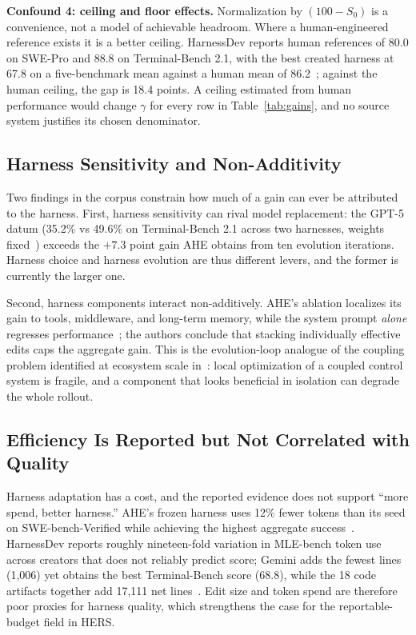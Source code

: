 \documentclass[conference]{IEEEtran}
\begin{document}
\textbf{Confound 4: ceiling and floor effects.} Normalization by $(100-S_0)$ is a convenience, not a model of achievable headroom. Where a human-engineered reference exists it is a better ceiling. HarnessDev reports human references of 80.0 on SWE-Pro and 88.8 on Terminal-Bench 2.1, with the best created harness at 67.8 on a five-benchmark mean against a human mean of 86.2~\cite{b6}; against the human ceiling, the gap is 18.4 points. A ceiling estimated from human performance would change $\gamma$ for every row in Table~\ref{tab:gains}, and no source system justifies its chosen denominator.

\subsection{Harness Sensitivity and Non-Additivity}

Two findings in the corpus constrain how much of a gain can ever be attributed to the harness. First, harness sensitivity can rival model replacement: the GPT-5 datum (35.2\% vs 49.6\% on Terminal-Bench 2.1 across two harnesses, weights fixed~\cite{b6}) exceeds the $+7.3$ point gain AHE obtains from ten evolution iterations. Harness choice and harness evolution are thus different levers, and the former is currently the larger one.

Second, harness components interact non-additively. AHE's ablation localizes its gain to tools, middleware, and long-term memory, while the system prompt \emph{alone} regresses performance~\cite{b3}; the authors conclude that stacking individually effective edits caps the aggregate gain. This is the evolution-loop analogue of the coupling problem identified at ecosystem scale in~\cite{b2}: local optimization of a coupled control system is fragile, and a component that looks beneficial in isolation can degrade the whole rollout.

\subsection{Efficiency Is Reported but Not Correlated with Quality}

Harness adaptation has a cost, and the reported evidence does not support ``more spend, better harness.'' AHE's frozen harness uses 12\% fewer tokens than its seed on SWE-bench-Verified while achieving the highest aggregate success~\cite{b3}. HarnessDev reports roughly nineteen-fold variation in MLE-bench token use across creators that does not reliably predict score; Gemini adds the fewest lines (1,006) yet obtains the best Terminal-Bench score (68.8), while the 18 code artifacts together add 17,111 net lines~\cite{b6}. Edit size and token spend are therefore poor proxies for harness quality, which strengthens the case for the reportable-budget field in HERS.
\end{document}
